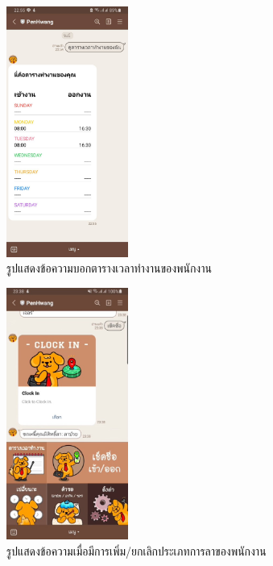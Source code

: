 \begin{figure}
  \begin{center}
    \includegraphics[width=4cm,keepaspectratio]{./images/message_slot.jpg}
  \end{center}
  \caption[รูปแสดงข้อความบอกตารางเวลาทำงานของพนักงาน]{รูปแสดงข้อความบอกตารางเวลาทำงานของพนักงาน} 
  \label{fig:message_slot}
\end{figure}

\begin{figure}
  \begin{center}
    \includegraphics[width=4cm,keepaspectratio]{./images/added_leave.jpg}
  \end{center}
  \caption[รูปแสดงข้อความเมื่อมีการเพิ่ม/ยกเลิกประเภทการลาของพนักงาน]{รูปแสดงข้อความเมื่อมีการเพิ่ม/ยกเลิกประเภทการลาของพนักงาน} 
  \label{fig:added_leave}
\end{figure}

